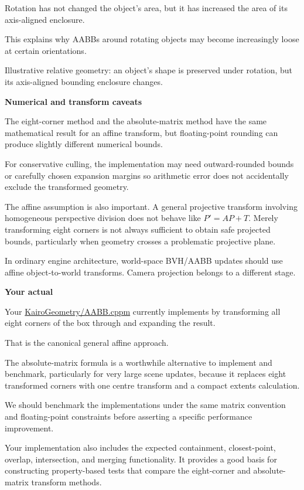 Rotation has not changed the object's area, but it has increased the area of its axis-aligned enclosure.

This explains why AABBs around rotating objects may become increasingly loose at certain orientations.

Illustrative relative geometry: an object's shape is preserved under rotation, but its axis-aligned bounding enclosure changes.

\textbf{Numerical and transform caveats}

The eight-corner method and the absolute-matrix method have the same mathematical result for an affine transform, but floating-point rounding can produce slightly different numerical bounds.

For conservative culling, the implementation may need outward-rounded bounds or carefully chosen expansion margins so arithmetic error does not accidentally exclude the transformed geometry.

The affine assumption is also important. A general projective transform involving homogeneous perspective division does not behave like \(P'=AP+T\). Merely transforming eight corners is not always sufficient to obtain safe projected bounds, particularly when geometry crosses a problematic projective plane.

In ordinary engine architecture, world-space BVH/AABB updates should use affine object-to-world transforms. Camera projection belongs to a different stage.

\textbf{Your actual }

Your \href{https://github.com/swayam8624/KairoGeometry/blob/master/AABB.cppm?utm_source=chatgpt.com}{KairoGeometry/AABB.cppm} currently implements  by transforming all eight corners of the box through  and expanding the result.

That is the canonical general affine approach.

The absolute-matrix formula is a worthwhile alternative to implement and benchmark, particularly for very large scene updates, because it replaces eight transformed corners with one centre transform and a compact extents calculation.

We should benchmark the implementations under the same matrix convention and floating-point constraints before asserting a specific performance improvement.

Your implementation also includes the expected containment, closest-point, overlap, intersection, and merging functionality. It provides a good basis for constructing property-based tests that compare the eight-corner and absolute-matrix transform methods.

